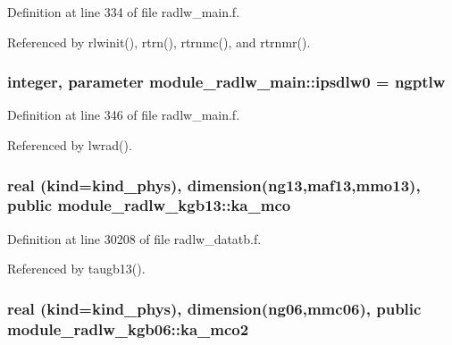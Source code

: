 Definition at line 334 of file radlw\+\_\+main.\+f.



Referenced by rlwinit(), rtrn(), rtrnmc(), and rtrnmr().

\subsubsection[{\texorpdfstring{ipsdlw0}{ipsdlw0}}]{\setlength{\rightskip}{0pt plus 5cm}integer, parameter module\+\_\+radlw\+\_\+main\+::ipsdlw0 = ngptlw\hspace{0.3cm}{\ttfamily [private]}}\hypertarget{group__module__radlw__main_ga9b634a4f7b06ffdd919de69a165edadc}{}\label{group__module__radlw__main_ga9b634a4f7b06ffdd919de69a165edadc}


Definition at line 346 of file radlw\+\_\+main.\+f.



Referenced by lwrad().

\subsubsection[{\texorpdfstring{ka\+\_\+mco}{ka_mco}}]{\setlength{\rightskip}{0pt plus 5cm}real (kind=kind\+\_\+phys), dimension(ng13,maf13,mmo13), public module\+\_\+radlw\+\_\+kgb13\+::ka\+\_\+mco}\hypertarget{group__module__radlw__main_ga0c2f5802f9471c35759cb673dbc8ca05}{}\label{group__module__radlw__main_ga0c2f5802f9471c35759cb673dbc8ca05}


Definition at line 30208 of file radlw\+\_\+datatb.\+f.



Referenced by taugb13().

\subsubsection[{\texorpdfstring{ka\+\_\+mco2}{ka_mco2}}]{\setlength{\rightskip}{0pt plus 5cm}real (kind=kind\+\_\+phys), dimension(ng06,mmc06), public module\+\_\+radlw\+\_\+kgb06\+::ka\+\_\+mco2}\hypertarget{group__module__radlw__main_gadb5dab732383b82e89f1048ab5150c23}{}\label{group__module__radlw__main_gadb5dab732383b82e89f1048ab5150c23}


